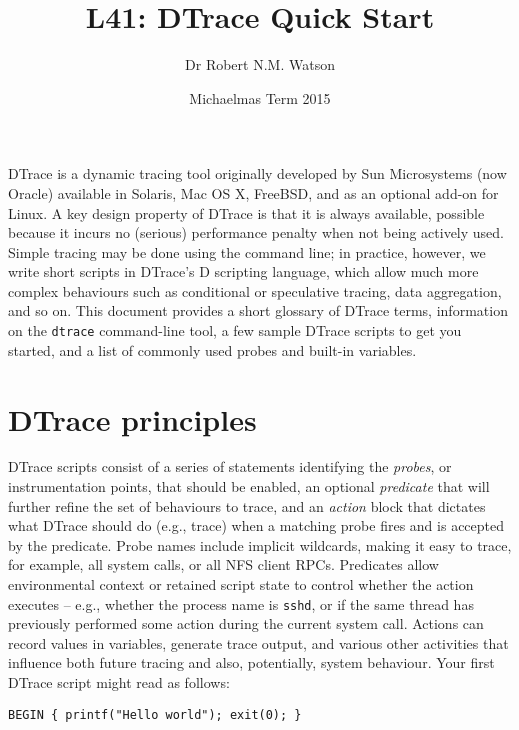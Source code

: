 \documentclass[a4paper,10pt]{article}
\begin{document}
\newcommand{\code}[1]{\texttt{\small #1}}

\title{L41: DTrace Quick Start}
\author{Dr Robert N.M. Watson}
\date{Michaelmas Term 2015}
\maketitle

DTrace is a dynamic tracing tool originally developed by Sun Microsystems (now
Oracle) available in Solaris, Mac OS X, FreeBSD, and as an optional add-on for
Linux.
A key design property of DTrace is that it is always available, possible
because it incurs no (serious) performance penalty when not being actively
used.
Simple tracing may be done using the command line; in practice, however, we
write short scripts in DTrace's D scripting language, which allow much more
complex behaviours such as conditional or speculative tracing, data
aggregation, and so on.
This document provides a short glossary of DTrace terms, information on the
\code{dtrace} command-line tool, a few sample DTrace scripts to get you
started, and a list of commonly used probes and built-in variables.

\section*{DTrace principles}

DTrace scripts consist of a series of statements identifying the
\textit{probes}, or instrumentation points, that should be enabled, an
optional \textit{predicate} that will further refine the set of behaviours to
trace, and an \textit{action} block that dictates what DTrace should do (e.g.,
trace) when a matching probe fires and is accepted by the predicate.
Probe names include implicit wildcards, making it easy to trace, for example,
all system calls, or all NFS client RPCs.
Predicates allow environmental context or retained script state to control
whether the action executes -- e.g., whether the process name is \code{sshd},
or if the same thread has previously performed some action during the current
system call.
Actions can record values in variables, generate trace output, and various
other activities that influence both future tracing and also, potentially,
system behaviour.
Your first DTrace script might read as follows:

\begin{small}
\begin{verbatim}
BEGIN { printf("Hello world"); exit(0); }
\end{verbatim}
\end{small}
\end{document}
